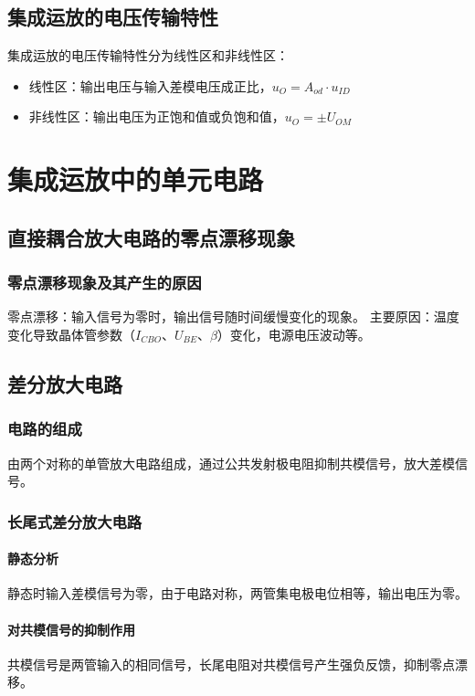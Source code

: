 \subsection{集成运放的电压传输特性}
集成运放的电压传输特性分为线性区和非线性区：
\begin{itemize}
    \item 线性区：输出电压与输入差模电压成正比，$u_O = A_{od} \cdot u_{ID}$
    \item 非线性区：输出电压为正饱和值或负饱和值，$u_O = \pm U_{OM}$
\end{itemize}

\section{集成运放中的单元电路}
\subsection{直接耦合放大电路的零点漂移现象}
\subsubsection{零点漂移现象及其产生的原因}
零点漂移：输入信号为零时，输出信号随时间缓慢变化的现象。
主要原因：温度变化导致晶体管参数（$I_{CBO}$、$U_{BE}$、$\beta$）变化，电源电压波动等。

\subsection{差分放大电路}
\subsubsection{电路的组成}
由两个对称的单管放大电路组成，通过公共发射极电阻抑制共模信号，放大差模信号。

\subsubsection{长尾式差分放大电路}
\paragraph{静态分析}
静态时输入差模信号为零，由于电路对称，两管集电极电位相等，输出电压为零。

\paragraph{对共模信号的抑制作用}
共模信号是两管输入的相同信号，长尾电阻对共模信号产生强负反馈，抑制零点漂移。

